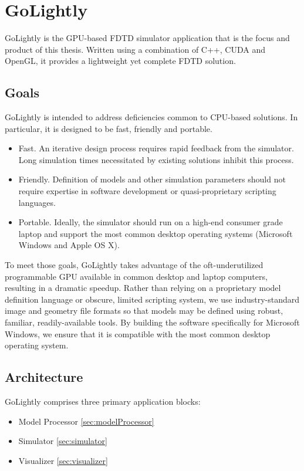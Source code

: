 \chapter{GoLightly} \label{ch:golightly}

GoLightly is the GPU-based FDTD simulator application that is the focus and product of this thesis. Written using a combination of C++, CUDA and OpenGL, it provides a lightweight yet complete FDTD solution.

\section{Goals}

GoLightly is intended to address deficiencies common to CPU-based solutions. In particular, it is designed to be fast, friendly and portable.


\begin{itemize}
	\item Fast. An iterative design process requires rapid feedback from the simulator. Long simulation times necessitated by existing solutions inhibit this process.
	\item Friendly. Definition of models and other simulation parameters should not require expertise in software development or quasi-proprietary scripting languages. 
	\item Portable. Ideally, the simulator should run on a high-end consumer grade laptop and support the most common desktop operating systems (Microsoft Windows and Apple OS X).  
\end{itemize}

To meet those goals, GoLightly takes advantage of the oft-underutilized programmable GPU available in common desktop and laptop computers, resulting in a dramatic speedup. Rather than relying on a proprietary model definition language or obscure, limited scripting system, we use industry-standard image and geometry file formats so that models may be defined using robust, familiar, readily-available tools. By building the software specifically for Microsoft Windows, we ensure that it is compatible with the most common desktop operating system. 

\section{Architecture}

GoLightly comprises three primary application blocks:

\begin{itemize}
	\item Model Processor \ref{sec:modelProcessor}
	\item Simulator \ref{sec:simulator}
	\item Visualizer \ref{sec:visualizer}
\end{itemize}


